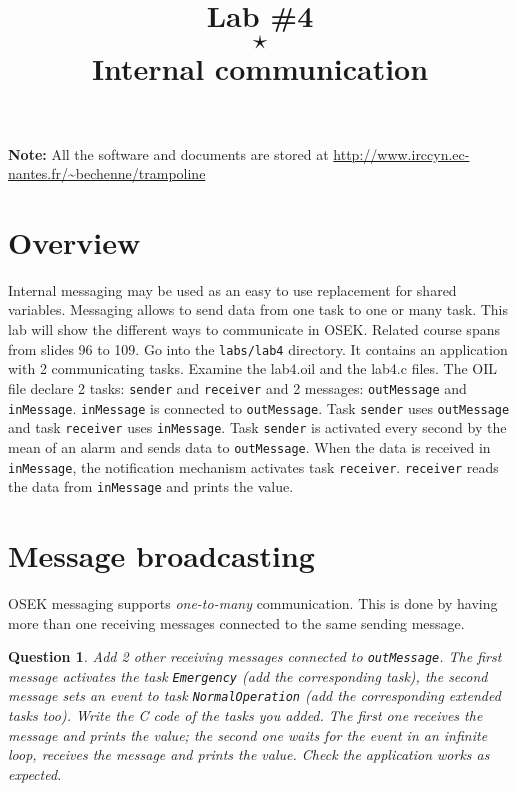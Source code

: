 \documentclass[11pt]{article}
\title{Lab \#4\\$\star$\\Internal communication}
\author{}
\newtheorem{ex}{Question}
\begin{document}
\maketitle

{\bf Note:} All the software and documents are stored at \url{http://www.irccyn.ec-nantes.fr/~bechenne/trampoline}

\section{Overview}

Internal messaging may be used as an easy to use replacement for shared variables. Messaging allows to send data from one task to one or many task. This lab will show the different ways to communicate in OSEK.
Related course spans from slides 96 to 109.
Go into the \texttt{labs/lab4} directory. It contains an application with 2 communicating tasks.
Examine the lab4.oil and the lab4.c files.
The OIL file declare 2 tasks: \texttt{sender} and \texttt{receiver} and 2 messages: \texttt{outMessage} and \texttt{inMessage}. \texttt{inMessage} is connected to \texttt{outMessage}. Task \texttt{sender} uses \texttt{outMessage} and task \texttt{receiver} uses \texttt{inMessage}.
Task \texttt{sender} is activated every second by the mean of an alarm and sends data to \texttt{outMessage}. When the data is received in \texttt{inMessage}, the notification mechanism activates task \texttt{receiver}. \texttt{receiver} reads the data from \texttt{inMessage} and prints the value.

\section{Message broadcasting}

OSEK messaging supports \emph{one-to-many} communication. This is done by having more than one receiving messages connected to the same sending message.
\begin{ex}
Add 2 other receiving messages connected to \texttt{outMessage}. The first message activates the task \texttt{Emergency} (add the corresponding task), the second message sets an event to task \texttt{NormalOperation} (add the corresponding extended tasks too). Write the C code of the tasks you added. The first one receives the message and prints the value; the second one waits for the event in an infinite loop, receives the message and prints the value. Check the application works as expected.
\end{ex}
\end{document}
